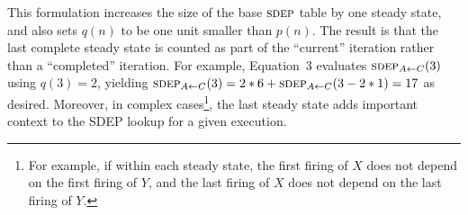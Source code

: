 \documentclass{sig-alternate}
\begin{document}
This formulation increases the size of the base $\textsc{sdep}$ table by one
steady state, and also sets 
$q(n)$ to be one unit smaller than $p(n)$.  The result is that the
last complete steady state is counted as part of the ``current''
iteration rather than a ``completed'' iteration.  For example,
Equation~3 evaluates $\sdepf{A}{C}(3)$ using $q(3)=2$, yielding
$\sdepf{A}{C}(3) = 2*6 + \sdepf{A}{C}(3-2*1) = 17$ as desired.
Moreover, in complex cases\footnote{{\small For example, if within
each steady state, the first firing of $X$ does not depend on the
first firing of $Y$, and the last firing of $X$ does not depend on the
last firing of $Y$.}}, the last steady state adds important context to
the SDEP lookup for a given execution.










\end{document}
